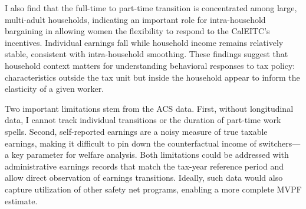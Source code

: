\documentclass[11pt]{article}
\begin{document}
I also find that the full-time to part-time transition is concentrated among large, multi-adult households, indicating an important role for intra-household bargaining in allowing women the flexibility to respond to the CalEITC's incentives. Individual earnings fall while household income remains relatively stable, consistent with intra-household smoothing. These findings suggest that household context matters for understanding behavioral responses to tax policy: characteristics outside the tax unit but inside the household appear to inform the elasticity of a given worker.

Two important limitations stem from the ACS data. First, without longitudinal data, I cannot track individual transitions or the duration of part-time work spells. Second, self-reported earnings are a noisy measure of true taxable earnings, making it difficult to pin down the counterfactual income of switchers---a key parameter for welfare analysis. Both limitations could be addressed with administrative earnings records that match the tax-year reference period and allow direct observation of earnings transitions. Ideally, such data would also capture utilization of other safety net programs, enabling a more complete MVPF estimate.


\newpage






\appendix
\setcounter{section}{0}
\setcounter{table}{0}
\setcounter{figure}{0}
\renewcommand{\figurename}{Appendix Figure}
\renewcommand{\tablename}{Appendix Table}

\def\tableautorefname{Appendix Table}
\def\figureautorefname{Appendix Figure}
\renewcommand*{\thesection}{\Alph{section}}
\renewcommand*{\thesubsection}{\thesection.\arabic{subsection}}

\let\subsectionautorefname\sectionautorefname
\let\subsubsectionautorefname\sectionautorefname

\clearpage
\end{document}
